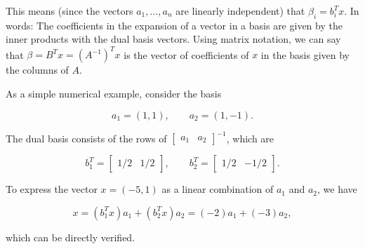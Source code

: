 This means (since the vectors \(a_{1},\ldots,a_{n}\) are linearly independent) that \(\beta_{i}=b_{i}^{T}x\). In words: The coefficients in the expansion of a vector in a basis are given by the inner products with the dual basis vectors. Using matrix notation, we can say that \(\beta=B^{T}x=(A^{-1})^{T}x\) is the vector of coefficients of \(x\) in the basis given by the columns of \(A\).

As a simple numerical example, consider the basis

\[a_{1}=(1,1),\qquad a_{2}=(1,-1).\]

The dual basis consists of the rows of \([\begin{array}{cc}a_{1}&a_{2}\end{array}]^{-1}\), which are

\[b_{1}^{T}=\left[\begin{array}{cc}1/2&1/2\end{array}\right],\qquad b_{2}^{T }=\left[\begin{array}{cc}1/2&-1/2\end{array}\right].\]

To express the vector \(x=(-5,1)\) as a linear combination of \(a_{1}\) and \(a_{2}\), we have

\[x=(b_{1}^{T}x)a_{1}+(b_{2}^{T}x)a_{2}=(-2)a_{1}+(-3)a_{2},\]

which can be directly verified.

 